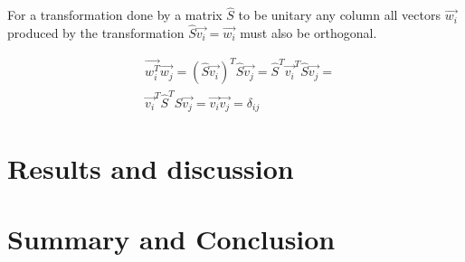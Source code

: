 \documentclass[twoside,twocolumn]{article}
\begin{document}
	For a transformation done by a matrix $\hat{S}$ to be unitary any column all vectors $\vec{w_i}$ produced by the transformation $\hat{S}\vec{v_i} = \vec{w_i}$ must also be orthogonal.
	
	\begin{align*}
	&\vec{w_i^T}\vec{w_j} = (\hat{S}\vec{v_i})^T\hat{S}\vec{v_j} = \hat{S}^T\vec{v_i}^T\hat{S}\vec{v_j} = \\ &\vec{v_i}^T\hat{S}^T\hat{S}\vec{v_j} = \vec{v_i}\vec{v_j} = \delta_{ij}
	\end{align*}
	
	\section{Results and discussion}
	
	
	\section{Summary and Conclusion}
	
	{}
	
	
\end{document}
